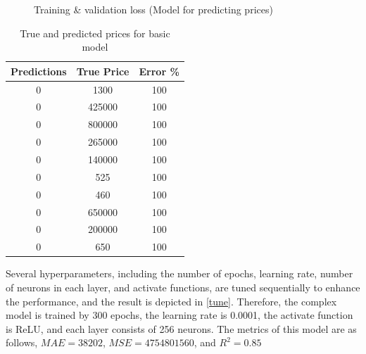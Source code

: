 \documentclass[12pt,twoside]{report}
\begin{document}
\begin{figure}[!htbp]
	\hfil
	\caption{Training \& validation loss (Model for predicting prices)}
	\label{all_complex_full_epoch_1000}
\end{figure}

\begin{table}[!htbp]
	\centering
	\caption{ True and predicted prices for basic model}
	\label{complex_model_prediction_price}
	\begin{tabular}{| c | c | c |}
		\hline
		Predictions & True Price & Error \% \\
		\hline
		0 & 1300 & 100 \\
		\hline
		0 & 425000 & 100 \\
		\hline
		0 & 800000 & 100 \\
		\hline
		0 & 265000 & 100 \\
		\hline
		0 & 140000 & 100 \\
		\hline
		0 & 525 & 100 \\
		\hline
		0 & 460 & 100 \\ 
		\hline
		0 & 650000 & 100 \\
		\hline
		0 & 200000 & 100 \\
		\hline
		0 & 650 & 100 \\
		\hline
	\end{tabular}
\end{table}

Several hyperparameters, including the number of epochs, learning rate, number of neurons in each layer, and activate functions, are tuned sequentially to enhance the performance, and the result is depicted in \ref{tune}. Therefore, the complex model is trained by 300 epochs, the learning rate is 0.0001, the activate function is ReLU, and each layer consists of 256 neurons. The metrics of this model are as follows, $MAE = 38202$, $MSE = 4754801560$, and $R^2 = 0.85$
\end{document}
